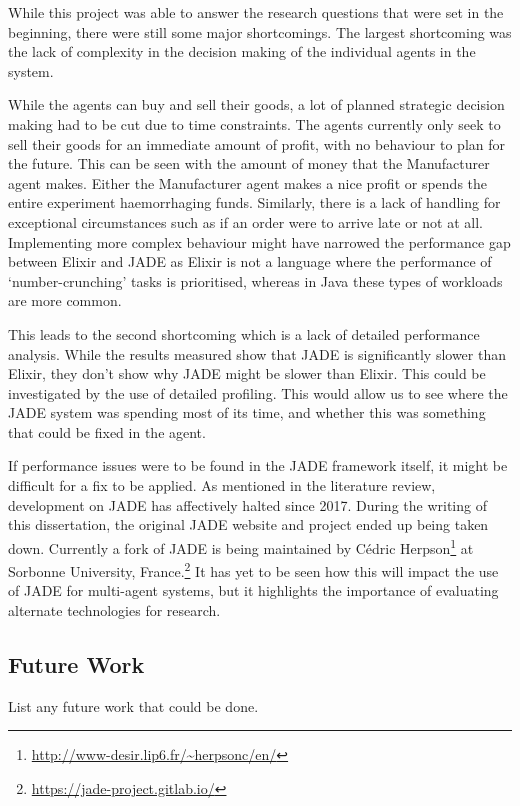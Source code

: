 While this project was able to answer the research questions that were set in the beginning, there were still some major shortcomings.
The largest shortcoming was the lack of complexity in the decision making of the individual agents in the system.

While the agents can buy and sell their goods, a lot of planned strategic decision making had to be cut due to time constraints.
The agents currently only seek to sell their goods for an immediate amount of profit, with no behaviour to plan for the future.
This can be seen with the amount of money that the Manufacturer agent makes.
Either the Manufacturer agent makes a nice profit or spends the entire experiment haemorrhaging funds.
Similarly, there is a lack of handling for exceptional circumstances such as if an order were to arrive late or not at all.
Implementing more complex behaviour might have narrowed the performance gap between Elixir and JADE as Elixir is not a language where the performance of `number-crunching' tasks is prioritised, whereas in Java these types of workloads are more common.

This leads to the second shortcoming which is a lack of detailed performance analysis.
While the results measured show that JADE is significantly slower than Elixir, they don't show why JADE might be slower than Elixir.
This could be investigated by the use of detailed profiling.
This would allow us to see where the JADE system was spending most of its time, and whether this was something that could be fixed in the agent.

If performance issues were to be found in the JADE framework itself, it might be difficult for a fix to be applied.
As mentioned in the literature review, development on JADE has affectively halted since 2017.
During the writing of this dissertation, the original JADE website and project ended up being taken down.
Currently a fork of JADE is being maintained by C\'edric Herpson\footnote{\url{http://www-desir.lip6.fr/~herpsonc/en/}} at Sorbonne University, France.\footnote{\url{https://jade-project.gitlab.io/}}
It has yet to be seen how this will impact the use of JADE for multi-agent systems, but it highlights the importance of evaluating alternate technologies for research.

\subsection{Future Work}

List any future work that could be done.
